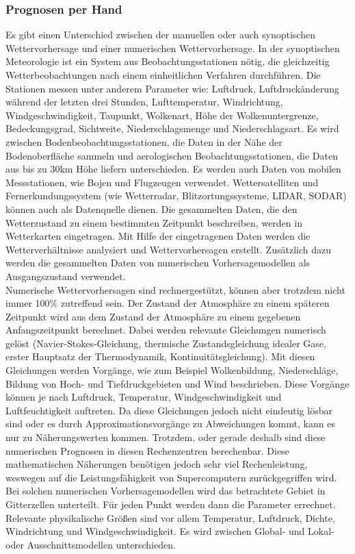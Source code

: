 \subsubsection{Prognosen per Hand} %
Es gibt einen Unterschied zwischen der manuellen oder auch
synoptischen Wettervorhersage und einer numerischen Wettervorhersage.
In der synoptischen Meteorologie ist ein System aus Beobachtungsstationen
nötig, die gleichzeitig Wetterbeobachtungen nach einem einheitlichen Verfahren durchführen.
Die Stationen messen unter anderem Parameter wie:
Luftdruck, Luftdruckänderung während der letzten drei Stunden,
Lufttemperatur, Windrichtung, Windgeschwindigkeit, Taupunkt,
Wolkenart, Höhe der Wolkenuntergrenze, Bedeckungsgrad,
Sichtweite, Niederschlagsmenge und Niederschlagsart.
Es wird zwischen Bodenbeobachtungsstationen, die Daten in der Nähe
der Bodenoberfläche sammeln und aerologischen Beobachtungsstationen,
die Daten aus bis zu 30km Höhe liefern unterschieden.
Es werden auch Daten von mobilen Messstationen, wie Bojen und Flugzeugen verwendet.
Wettersatelliten und Fernerkundungssystem
(wie Wetterradar, Blitzortungssysteme, LIDAR, SODAR) können auch als Datenquelle dienen.
Die gesammelten Daten, die den Wetterzustand zu einem bestimmten
Zeitpunkt beschreiben, werden in Wetterkarten eingetragen.
Mit Hilfe der eingetragenen Daten werden die Wetterverhältnisse
analysiert und Wettervorhersagen erstellt.
Zusätzlich dazu werden die gesammelten Daten von numerischen
Vorhersagemodellen als Ausgangszustand verwendet. \cite{noaa}
\\
Numerische Wettervorhersagen sind rechnergestützt, können aber trotzdem nicht
immer 100\% zutreffend sein.
Der Zustand der Atmosphäre zu einem späteren Zeitpunkt wird aus dem Zustand
der Atmosphäre zu einem gegebenen Anfangszeitpunkt berechnet.
Dabei werden relevante Gleichungen numerisch gelöst
(Navier-Stokes-Gleichung, thermische Zustandsgleichung idealer Gase,
erster Hauptsatz der Thermodynamik, Kontinuitätsgleichung).
Mit diesen Gleichungen werden Vorgänge, wie zum Beispiel Wolkenbildung,
Niederschläge, Bildung von Hoch- und Tiefdruckgebieten und Wind beschrieben.
Diese Vorgänge können je nach Luftdruck, Temperatur, Windgeschwindigkeit
und Luftfeuchtigkeit auftreten.
Da diese Gleichungen jedoch nicht eindeutig lösbar sind oder es
durch Approximationsvorgänge zu Abweichungen kommt, kann es nur zu Näherungswerten kommen.
Trotzdem, oder gerade deshalb sind diese numerischen Prognosen in diesen Rechenzentren berechenbar.
Diese mathematischen Näherungen benötigen jedoch sehr viel Rechenleistung,
weswegen auf die Leistungsfähigkeit von Supercomputern zurückgegriffen wird.
Bei solchen numerischen Vorhersagemodellen wird das betrachtete Gebiet in Gitterzellen unterteilt.
Für jeden Punkt werden dann die Parameter errechnet.
Relevante physikalische Größen sind vor allem Temperatur,
Luftdruck, Dichte, Windrichtung und Windgeschwindigkeit.
Es wird zwischen Global- und Lokal- oder Ausschnittsmodellen unterschieden.

